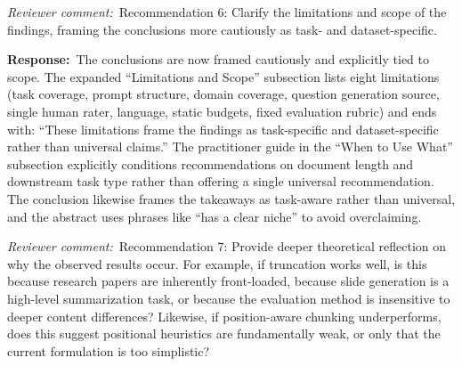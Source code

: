 \documentclass[11pt]{article}
\newcommand{\rcomment}[1]{\noindent\textcolor{revcomment}{\textit{Reviewer comment:}}~#1\par\medskip}
\newcommand{\rresponse}[1]{\noindent\textcolor{response}{\textbf{Response:}}~#1\par\medskip\medskip}
\begin{document}
\rcomment{Recommendation 6: Clarify the limitations and scope of the findings, framing the conclusions more cautiously as task- and dataset-specific.}

\rresponse{The conclusions are now framed cautiously and explicitly tied to scope. The expanded ``Limitations and Scope'' subsection lists eight limitations (task coverage, prompt structure, domain coverage, question generation source, single human rater, language, static budgets, fixed evaluation rubric) and ends with: ``These limitations frame the findings as task-specific and dataset-specific rather than universal claims.'' The practitioner guide in the ``When to Use What'' subsection explicitly conditions recommendations on document length and downstream task type rather than offering a single universal recommendation. The conclusion likewise frames the takeaways as task-aware rather than universal, and the abstract uses phrases like ``has a clear niche'' to avoid overclaiming.}

\rcomment{Recommendation 7: Provide deeper theoretical reflection on why the observed results occur. For example, if truncation works well, is this because research papers are inherently front-loaded, because slide generation is a high-level summarization task, or because the evaluation method is insensitive to deeper content differences? Likewise, if position-aware chunking underperforms, does this suggest positional heuristics are fundamentally weak, or only that the current formulation is too simplistic?}
\end{document}
